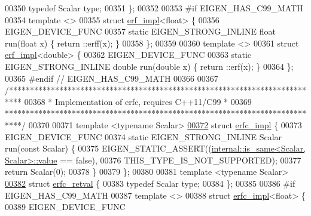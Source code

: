 \begin{DoxyCode}
00350   \textcolor{keyword}{typedef} Scalar type;
00351 \};
00352 
00353 \textcolor{preprocessor}{#if EIGEN\_HAS\_C99\_MATH}
00354 \textcolor{keyword}{template} <>
00355 \textcolor{keyword}{struct }\hyperlink{struct_eigen_1_1internal_1_1erf__impl}{erf\_impl}<float> \{
00356   EIGEN\_DEVICE\_FUNC
00357   \textcolor{keyword}{static} EIGEN\_STRONG\_INLINE \textcolor{keywordtype}{float} run(\textcolor{keywordtype}{float} x) \{ return ::erff(x); \}
00358 \};
00359 
00360 \textcolor{keyword}{template} <>
00361 \textcolor{keyword}{struct }\hyperlink{struct_eigen_1_1internal_1_1erf__impl}{erf\_impl}<double> \{
00362   EIGEN\_DEVICE\_FUNC
00363   \textcolor{keyword}{static} EIGEN\_STRONG\_INLINE \textcolor{keywordtype}{double} run(\textcolor{keywordtype}{double} x) \{ return ::erf(x); \}
00364 \};
00365 \textcolor{preprocessor}{#endif  // EIGEN\_HAS\_C99\_MATH}
00366 
00367 \textcolor{comment}{/***************************************************************************}
00368 \textcolor{comment}{* Implementation of erfc, requires C++11/C99                               *}
00369 \textcolor{comment}{****************************************************************************/}
00370 
00371 \textcolor{keyword}{template} <\textcolor{keyword}{typename} Scalar>
\hyperlink{struct_eigen_1_1internal_1_1erfc__impl}{00372} \textcolor{keyword}{struct }\hyperlink{struct_eigen_1_1internal_1_1erfc__impl}{erfc\_impl} \{
00373   EIGEN\_DEVICE\_FUNC
00374   \textcolor{keyword}{static} EIGEN\_STRONG\_INLINE Scalar run(\textcolor{keyword}{const} Scalar) \{
00375     EIGEN\_STATIC\_ASSERT((\hyperlink{struct_eigen_1_1internal_1_1is__same}{internal::is\_same<Scalar, Scalar>::value} 
      == \textcolor{keyword}{false}),
00376                         THIS\_TYPE\_IS\_NOT\_SUPPORTED);
00377     \textcolor{keywordflow}{return} Scalar(0);
00378   \}
00379 \};
00380 
00381 \textcolor{keyword}{template} <\textcolor{keyword}{typename} Scalar>
\hyperlink{struct_eigen_1_1internal_1_1erfc__retval}{00382} \textcolor{keyword}{struct }\hyperlink{struct_eigen_1_1internal_1_1erfc__retval}{erfc\_retval} \{
00383   \textcolor{keyword}{typedef} Scalar type;
00384 \};
00385 
00386 \textcolor{preprocessor}{#if EIGEN\_HAS\_C99\_MATH}
00387 \textcolor{keyword}{template} <>
00388 \textcolor{keyword}{struct }\hyperlink{struct_eigen_1_1internal_1_1erfc__impl}{erfc\_impl}<float> \{
00389   EIGEN\_DEVICE\_FUNC

\end{DoxyCode}
